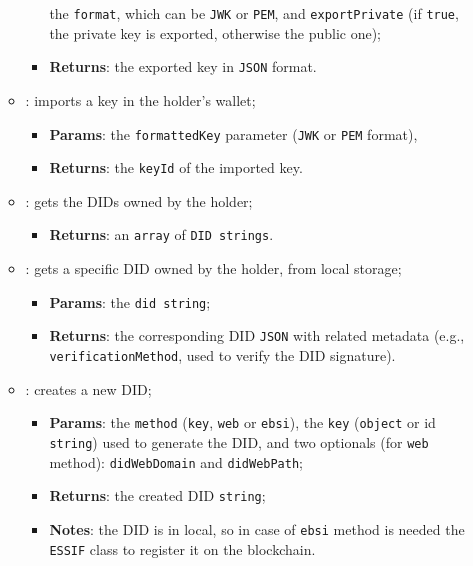 \begin{itemize}
\begin{itemize}
\begin{itemize}
            the \texttt{format}, which can be \texttt{JWK} or \texttt{PEM}, and \texttt{exportPrivate}
            (if \texttt{true}, the private key is exported, otherwise the public one);
            \item \textbf{Returns}: the exported key in \texttt{JSON} format.
        \end{itemize}
        \item[] : imports a key in the holder's wallet;
        \begin{itemize}
            \item \textbf{Params}: the \texttt{formattedKey} parameter (\texttt{JWK} or \texttt{PEM} format),
            \item \textbf{Returns}: the \texttt{keyId} of the imported key.
        \end{itemize}
        \item[] : gets the DIDs owned by the holder;
        \begin{itemize}
            \item \textbf{Returns}: an \texttt{array} of \texttt{DID strings}.
        \end{itemize}
        \item[] : gets a specific DID owned by the holder, from local storage;
        \begin{itemize}
            \item \textbf{Params}: the \texttt{did string};
            \item \textbf{Returns}: the corresponding DID \texttt{JSON} with related metadata
            (e.g., \texttt{verificationMethod}, used to verify the DID signature).
        \end{itemize}
        \item[] : creates a new DID;
        \begin{itemize}
            \item \textbf{Params}: the \texttt{method} (\texttt{key}, \texttt{web} or \texttt{ebsi}),
            the \texttt{key} (\texttt{object} or id \texttt{string}) used to generate the DID, and
            two optionals (for \texttt{web} method): \texttt{didWebDomain} and \texttt{didWebPath};
            \item \textbf{Returns}: the created DID \texttt{string};
            \item \textbf{Notes}: the DID is in local, so in case of \texttt{ebsi} method
            is needed the \texttt{ESSIF} class to register it on the blockchain.

\end{itemize}
\end{itemize}
\end{itemize}
